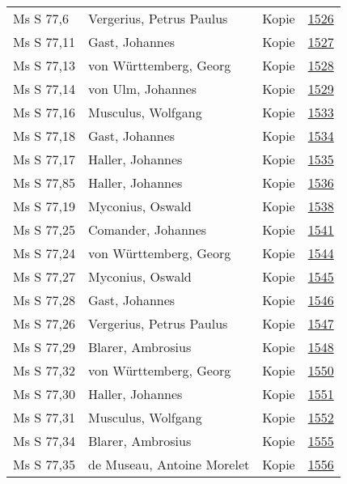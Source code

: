 \documentclass[10pt,a4paper,landscape]{report}
\begin{document}
\begin{longtable}{p{16cm}p{4cm}lr}
Ms S 77,6	&	Vergerius, Petrus Paulus	&	Kopie	&	\href{http://130.60.24.72/assignment/1526}{1526}\\
Ms S 77,11	&	Gast, Johannes	&	Kopie	&	\href{http://130.60.24.72/assignment/1527}{1527}\\
Ms S 77,13	&	von Württemberg, Georg	&	Kopie	&	\href{http://130.60.24.72/assignment/1528}{1528}\\
Ms S 77,14	&	von Ulm, Johannes	&	Kopie	&	\href{http://130.60.24.72/assignment/1529}{1529}\\
Ms S 77,16	&	Musculus, Wolfgang	&	Kopie	&	\href{http://130.60.24.72/assignment/1533}{1533}\\
Ms S 77,18	&	Gast, Johannes	&	Kopie	&	\href{http://130.60.24.72/assignment/1534}{1534}\\
Ms S 77,17	&	Haller, Johannes	&	Kopie	&	\href{http://130.60.24.72/assignment/1535}{1535}\\
Ms S 77,85	&	Haller, Johannes	&	Kopie	&	\href{http://130.60.24.72/assignment/1536}{1536}\\
Ms S 77,19	&	Myconius, Oswald	&	Kopie	&	\href{http://130.60.24.72/assignment/1538}{1538}\\
Ms S 77,25	&	Comander, Johannes	&	Kopie	&	\href{http://130.60.24.72/assignment/1541}{1541}\\
Ms S 77,24	&	von Württemberg, Georg	&	Kopie	&	\href{http://130.60.24.72/assignment/1544}{1544}\\
Ms S 77,27	&	Myconius, Oswald	&	Kopie	&	\href{http://130.60.24.72/assignment/1545}{1545}\\
Ms S 77,28	&	Gast, Johannes	&	Kopie	&	\href{http://130.60.24.72/assignment/1546}{1546}\\
Ms S 77,26	&	Vergerius, Petrus Paulus	&	Kopie	&	\href{http://130.60.24.72/assignment/1547}{1547}\\
Ms S 77,29	&	Blarer, Ambrosius	&	Kopie	&	\href{http://130.60.24.72/assignment/1548}{1548}\\
Ms S 77,32	&	von Württemberg, Georg	&	Kopie	&	\href{http://130.60.24.72/assignment/1550}{1550}\\
Ms S 77,30	&	Haller, Johannes	&	Kopie	&	\href{http://130.60.24.72/assignment/1551}{1551}\\
Ms S 77,31	&	Musculus, Wolfgang	&	Kopie	&	\href{http://130.60.24.72/assignment/1552}{1552}\\
Ms S 77,34	&	Blarer, Ambrosius	&	Kopie	&	\href{http://130.60.24.72/assignment/1555}{1555}\\
Ms S 77,35	&	de Museau, Antoine Morelet	&	Kopie	&	\href{http://130.60.24.72/assignment/1556}{1556}\\

\end{longtable}
\end{document}
